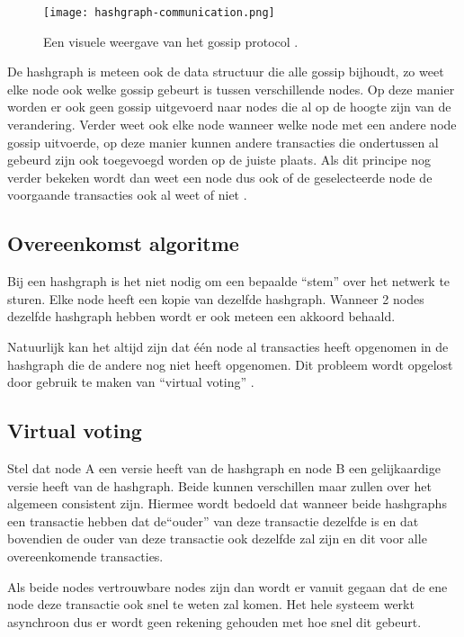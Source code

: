 \begin{figure}
	\texttt{[image: hashgraph-communication.png]}
	\caption{Een visuele weergave van het gossip protocol \textcite{Baird2016}.}
	\label{fig:hashgraph-gossip}
\end{figure}

De hashgraph is meteen ook de data structuur die alle gossip bijhoudt, zo weet elke node ook welke gossip gebeurt is tussen verschillende nodes. Op deze manier worden er ook geen gossip uitgevoerd naar nodes die al op de hoogte zijn van de verandering. Verder weet ook elke node wanneer welke node met een andere node gossip uitvoerde, op deze manier kunnen andere transacties die ondertussen al gebeurd zijn ook toegevoegd worden op de juiste plaats.
Als dit principe nog verder bekeken wordt dan weet een node dus ook of de geselecteerde node de voorgaande transacties ook al weet of niet \textcite{Baird2016a}.

\subsection{Overeenkomst algoritme}
Bij een hashgraph is het niet nodig om een bepaalde ``stem'' over het netwerk te sturen. Elke node heeft een kopie van dezelfde  hashgraph. Wanneer 2 nodes dezelfde hashgraph hebben 
wordt er ook meteen een akkoord behaald. 

Natuurlijk kan het altijd zijn dat één node al transacties heeft opgenomen in de hashgraph die de andere nog niet heeft opgenomen. Dit probleem wordt opgelost door gebruik te maken van ``virtual voting'' \textcite{Baird2016a}.

\subsection{Virtual voting}
Stel dat node A een versie heeft van de hashgraph en node B een gelijkaardige versie heeft van de hashgraph. Beide kunnen verschillen maar zullen over het algemeen consistent zijn. Hiermee wordt bedoeld dat wanneer beide hashgraphs een transactie hebben dat de``ouder'' van deze transactie dezelfde is en dat bovendien de ouder van deze transactie ook dezelfde zal zijn en dit voor alle overeenkomende transacties. 

Als beide nodes vertrouwbare nodes zijn dan wordt er vanuit gegaan dat de ene node deze transactie ook snel te weten zal komen. Het hele systeem werkt asynchroon dus er wordt geen rekening gehouden met hoe snel dit gebeurt.

